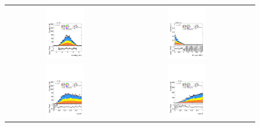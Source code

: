\begin{figure}[htbp]
\begin{tabular}{@{}c c c@{}}
    \includegraphics[width=0.33\textwidth]{images/plots_modelling_run2_run3_variables/run_3_tth/plot_jet_0_eta_hh_tth_22_23_24.pdf} &
    \includegraphics[width=0.33\textwidth]{images/plots_modelling_run2_run3_variables/run_3_tth/plot_ditau_met_min_dphi_hh_tth_22_23_24.pdf} \\[4pt]
    \includegraphics[width=0.33\textwidth]{images/plots_modelling_run2_run3_variables/run_3_tth/plot_ratio01_hh_tth_22_23_24.pdf} &
    \includegraphics[width=0.33\textwidth]{images/plots_modelling_run2_run3_variables/run_3_tth/plot_ratio12_hh_tth_22_23_24.pdf} &

\end{tabular}
\end{figure}
